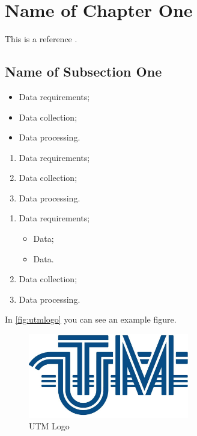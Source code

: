 \section{Name of Chapter One}

\lipsum[5]
This is a reference \cite{ref:zoo}.

\subsection{Name of Subsection One}

\lipsum[6]

\begin{itemize}
	\item Data requirements;
	\item Data collection;
	\item Data processing.
\end{itemize}

\lipsum[6]

\begin{enumerate}
	\item Data requirements;
	\item Data collection;
	\item Data processing.
\end{enumerate}

\lipsum[6]

\begin{enumerate}
	\item Data requirements;
	\begin{itemize}
    	\item Data;
    	\item Data.
    \end{itemize}
	\item Data collection;
	\item Data processing.
\end{enumerate}

\lipsum[5]
In \autoref{fig:utmlogo} you can see an example figure.

\begin{figure}[H]
    \centering
    \includegraphics[width=7cm]{"Chapter1/Logo"}
    \caption{UTM Logo \cite{ref:zoo2}}
    \label{fig:utmlogo}
\end{figure}

